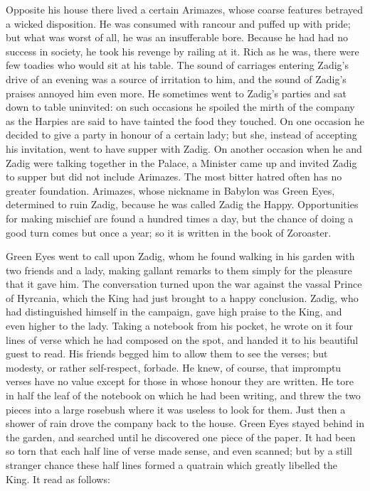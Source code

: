 \documentclass{article}
\begin{document}
\begin{center}
Opposite his house there lived a certain Arimazes, whose coarse features betrayed 
a wicked disposition. He was consumed with rancour and puffed up with pride; but 
what was worst of all, he was an insufferable bore. Because he had had no success 
in society, he took his revenge by railing at it. Rich as he was, there were few 
toadies who would sit at his table. The sound of carriages entering Zadig's drive 
of an evening was a source of irritation to him, and the sound of Zadig's praises 
annoyed him even more. He sometimes went to Zadig's parties and sat down to table 
uninvited: on such occasions he spoiled the mirth of the company as the Harpies 
are said to have tainted the food they touched. On one occasion he decided to give 
a party in honour of a certain lady; but she, instead of accepting his invitation, 
went to have supper with Zadig. On another occasion when he and Zadig were talking 
together in the Palace, a Minister came up and invited Zadig to supper but did 
not include Arimazes. The most bitter hatred often has no greater foundation. Arimazes, 
whose nickname in Babylon was Green Eyes, determined to ruin Zadig, because he 
was called Zadig the Happy. Opportunities for making mischief are found a hundred 
times a day, but the chance of doing a good turn comes but once a year; so it is 
written in the book of Zoroaster. 

Green Eyes went to call upon Zadig, whom he found walking in his garden with two 
friends and a lady, making gallant remarks to them simply for the pleasure that 
it gave him. The conversation turned upon the war against the vassal Prince of 
Hyrcania, which the King had just brought to a happy conclusion. Zadig, who had 
distinguished himself in the campaign, gave high praise to the King, and even higher 
to the lady. Taking a notebook from his pocket, he wrote on it four lines of verse 
which he had composed on the spot, and handed it to his beautiful guest to read. 
His friends begged him to allow them to see the verses; but modesty, or rather 
self-respect, forbade. He knew, of course, that impromptu verses have no value 
except for those in whose honour they are written. He tore in half the leaf of 
the notebook on which he had been writing, and threw the two pieces into a large 
rosebush where it was useless to look for them. Just then a shower of rain drove 
the company back to the house. Green Eyes stayed behind in the garden, and searched 
until he discovered one piece of the paper. It had been so torn that each half 
line of verse made sense, and even scanned; but by a still stranger chance these 
half lines formed a quatrain which greatly libelled the King. It read as follows: 


\end{center}
\end{document}
